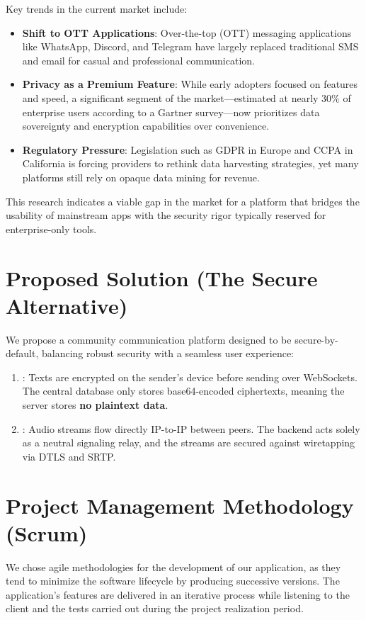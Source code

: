 Key trends in the current market include:
\begin{itemize}
    \item \textbf{Shift to OTT Applications}: Over-the-top (OTT) messaging applications like WhatsApp, Discord, and Telegram have largely replaced traditional SMS and email for casual and professional communication.
    \item \textbf{Privacy as a Premium Feature}: While early adopters focused on features and speed, a significant segment of the market—estimated at nearly 30\% of enterprise users according to a Gartner survey—now prioritizes data sovereignty and encryption capabilities over convenience.
    \item \textbf{Regulatory Pressure}: Legislation such as GDPR in Europe and CCPA in California is forcing providers to rethink data harvesting strategies, yet many platforms still rely on opaque data mining for revenue.
\end{itemize}

This research indicates a viable gap in the market for a platform that bridges the usability of mainstream apps with the security rigor typically reserved for enterprise-only tools.

\section{Proposed Solution (The Secure Alternative)}
We propose a community communication platform designed to be secure-by-default, balancing robust security with a seamless user experience:
\begin{enumerate}
    \item {}: Texts are encrypted on the sender's device before sending over WebSockets. The central database only stores base64-encoded ciphertexts, meaning the server stores \textbf{no plaintext data}.
    \item {}: Audio streams flow directly IP-to-IP between peers. The backend acts solely as a neutral signaling relay, and the streams are secured against wiretapping via DTLS and SRTP.
\end{enumerate}

\section{Project Management Methodology (Scrum)}
We chose agile methodologies for the development of our application, as they tend to minimize the software lifecycle by producing successive versions. The application's features are delivered in an iterative process while listening to the client and the tests carried out during the project realization period.

